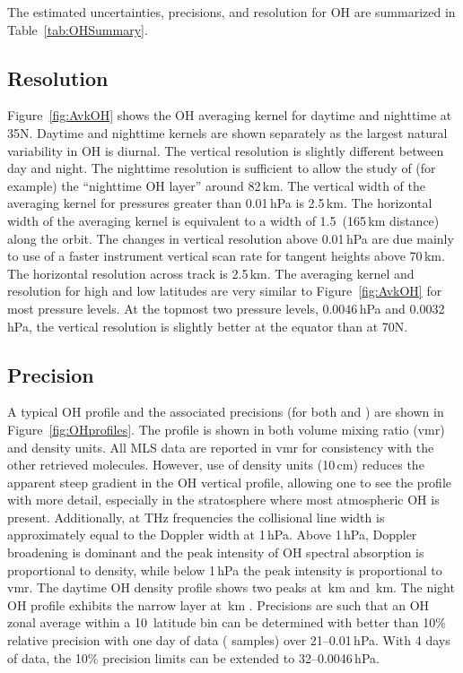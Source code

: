 The estimated uncertainties, precisions, and resolution for \thisv OH are summarized in Table~\ref{tab:OHSummary}.

\subsection{Resolution}

Figure~\ref{fig:AvkOH} shows the OH averaging kernel for daytime and nighttime at 35\degsym N. Daytime and nighttime kernels are shown separately as the largest natural variability in OH is diurnal. The vertical resolution is slightly different between day and night. The nighttime resolution is sufficient to allow the study of (for example) the ``nighttime OH layer'' around 82\,km. The vertical width of the averaging kernel for pressures greater than 0.01\,hPa is 2.5\,km. The horizontal width of the averaging kernel is equivalent to a width of 1.5\degsym~(165\,km distance) along the orbit. The changes in vertical resolution above 0.01\,hPa are due mainly to use of a faster instrument vertical scan rate for tangent heights above 70\,km. The horizontal resolution across track is 2.5\,km. The averaging kernel and resolution for high and low latitudes are very similar to Figure~\ref{fig:AvkOH} for most pressure levels. At the topmost two pressure levels, 0.0046\,hPa and 0.0032\,hPa, the vertical resolution is slightly better at the equator than at 70\degsym N.

\subsection{Precision}

A typical OH profile and the associated precisions (for both \prevv and \thisv) are shown in Figure~\ref{fig:OHprofiles}. The profile is shown in both volume mixing ratio (vmr) and density units. All MLS data are reported in vmr for consistency with the other retrieved molecules. However, use of density units (10\,cm) reduces the apparent steep gradient in the OH vertical profile, allowing one to see the profile with more detail, especially in the stratosphere where most atmospheric OH is present. Additionally, at THz frequencies the collisional line width is approximately equal to the Doppler width at 1\,hPa. Above 1\,hPa, Doppler broadening is dominant and the peak intensity of OH spectral absorption is proportional to density, while below 1\,hPa the peak intensity is proportional to vmr. The daytime OH density profile shows two peaks at \,km and \,km. The night OH profile exhibits the narrow layer at \,km \citep{PickettEtal:2006:NightOH}. Precisions are such that an OH zonal average within a 10\degsym\ latitude bin can be determined with better than 10\% relative precision with one day of data ( samples) over 21--0.01\,hPa. With 4 days of data, the 10\% precision limits can be extended to 32--0.0046\,hPa.

